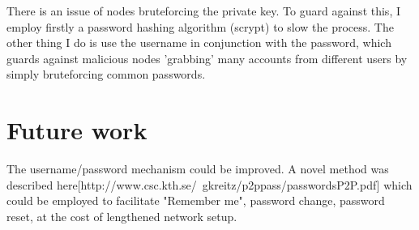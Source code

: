 \documentclass[10pt,a4paper,onecolumn]{article}
\begin{document}
There is an issue of nodes bruteforcing the private key. To guard against this, I employ firstly a password hashing algorithm (scrypt) to slow the process. The other thing I do is use the username in conjunction with the password, which guards against malicious nodes 'grabbing' many accounts from different users by simply bruteforcing common passwords. 

\section{Future work}
The username/password mechanism could be improved. A novel method was described here[http://www.csc.kth.se/~gkreitz/p2ppass/passwordsP2P.pdf] which could be employed to facilitate "Remember me", password change, password reset, at the cost of lengthened network setup. 
\end{document}
